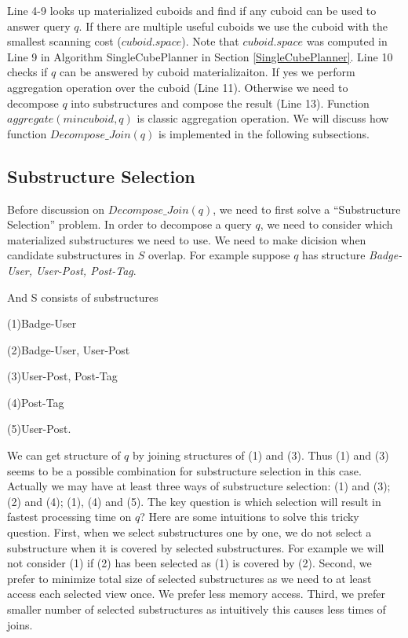 Line 4-9 looks up materialized cuboids and find if any cuboid can be used to answer query $q$. If there are multiple useful cuboids we use the cuboid with the smallest scanning cost ($cuboid.space$). Note that $cuboid.space$ was computed in Line 9 in Algorithm SingleCubePlanner in Section \ref{SingleCubePlanner}. Line 10 checks if $q$ can be answered by cuboid materializaiton. If yes we perform aggregation operation over the cuboid (Line 11). Otherwise we need to decompose $q$ into substructures and compose the result (Line 13). Function $aggregate(mincuboid, q)$ is classic aggregation operation. We will discuss how function $Decompose\_Join(q)$ is implemented in the following subsections. 

\subsection{Substructure Selection}
\label{Substructure Selection}

Before discussion on $Decompose\_Join(q)$, we need to first solve a ``Substructure Selection'' problem. In order to decompose a query $q$, we need to consider which materialized substructures we need to use. We need to make dicision when candidate substructures in $S$ overlap. For example suppose $q$ has structure \textit{Badge-User, User-Post, Post-Tag}.

And S consists of substructures 

(1)Badge-User

(2)Badge-User, User-Post 

(3)User-Post, Post-Tag

(4)Post-Tag

(5)User-Post.

We can get structure of $q$ by joining structures of (1) and (3). Thus (1) and (3) seems to be a possible combination for substructure selection in this case. Actually we may have at least three ways of substructure selection: (1) and (3); (2) and (4);
(1), (4) and (5). The key question is which selection will result in fastest processing time on $q$? Here are some intuitions to solve this tricky question. First, when we select substructures one by one, we do not select a substructure when it is covered by selected substructures. For example we will not consider (1) if (2) has been selected as (1) is covered by (2). Second, we prefer to minimize total size of selected substructures as we need to at least access each selected view once. We prefer less memory access. Third, we prefer smaller number of selected substructures as intuitively this causes less times of joins. 

